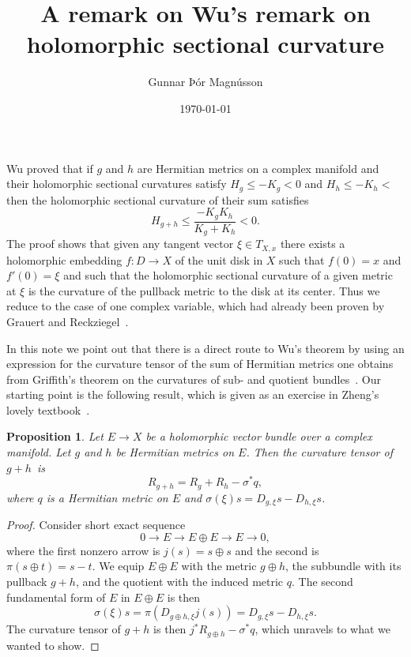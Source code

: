 \documentclass[10pt,a4paper]{amsart}
\author{Gunnar Þór Magnússon}
\date{\today}
\title{A remark on Wu's remark on\\holomorphic sectional curvature}
\newtheorem{prop}[theo]{Proposition}
\begin{document}
\maketitle


Wu \cite{wu1973remark} proved that if $g$ and $h$ are Hermitian metrics on a
complex manifold and their holomorphic sectional curvatures satisfy $H_g \leq
-K_g < 0$ and $H_h \leq -K_h < $ then the holomorphic sectional curvature of
their sum satisfies
\[
H_{g + h} \leq \frac{-K_g K_h}{K_g + K_h} < 0.
\]
The proof shows
that given any tangent vector $\xi \in T_{X,x}$ there
exists a holomorphic embedding $f : D \to X$ of the unit disk in $X$ such that
$f(0) = x$ and $f'(0) = \xi$ and such that the holomorphic sectional curvature
of a given metric at $\xi$ is the curvature of the pullback metric
to the disk at its center.
Thus we reduce to the case of one complex variable,
which had already been proven by Grauert and
Reckziegel~\cite{grauert1965hermitesche}.

In this note we point out that there is a direct route to Wu's theorem by using
an expression for the curvature tensor of the sum of Hermitian metrics one
obtains from Griffith's theorem on the curvatures of sub- and quotient
bundles~\cite{griffiths1965hermitian}. Our starting point is the following
result, which is given as an exercise in Zheng's lovely
textbook~\cite{zheng2000complex}.


\begin{prop}
Let $E \to X$ be a holomorphic vector bundle over a complex manifold.
Let $g$ and $h$ be Hermitian metrics on $E$.
Then the curvature tensor of $g + h$~is%
\[
R_{g + h} = R_g + R_h - \sigma^*q,
\]
where $q$ is a Hermitian metric on $E$ and $\sigma(\xi)s = D_{g,\xi} s -
D_{h,\xi} s$.
\end{prop}


\begin{proof}
Consider short exact sequence
\[
0 \longrightarrow
E \longrightarrow
E \oplus E \longrightarrow
E \longrightarrow
0,
\]
where the first nonzero arrow is $j(s) = s \oplus s$ and the second is $\pi(s
\oplus t) = s - t$.
We equip $E \oplus E$ with the metric $g \oplus h$, the subbundle with its
pullback $g + h$, and the quotient with the induced metric $q$.
The second fundamental form of $E$ in $E \oplus E$ is then
\[
\sigma(\xi) s
= \pi(D_{g \oplus h, \xi} j(s))
= D_{g,\xi}s - D_{h,\xi} s.
\]
The curvature tensor of $g + h$ is then $j^*R_{g \oplus h} - \sigma^* q$, which
unravels to what we wanted to show.
\end{proof}
\end{document}
